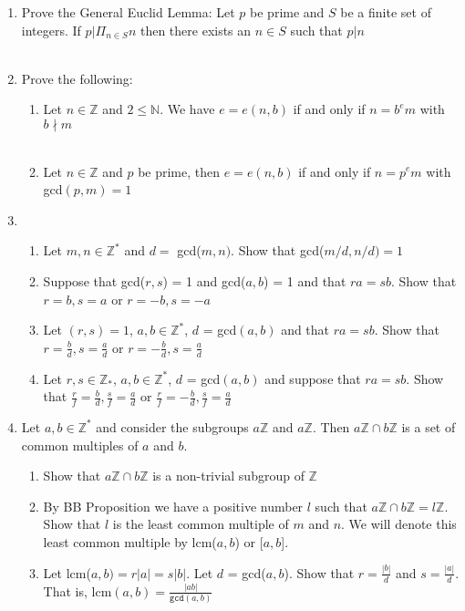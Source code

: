 \documentclass[11pt]{article}
\begin{document}
\begin{enumerate}
\begin{enumerate}
\end{enumerate}

\newpage %
\item Prove the General Euclid Lemma: Let $p$ be prime and $S$ be a finite set of integers.  If $p|\Pi_{n \in S}n$ then there exists an $n \in S$ such that $p | n$
\\
\\


\newpage %
\item Prove the following:
\begin{enumerate}
\item Let $n \in \mathbb{Z}$ and $2 \leq \mathbb{N}$.  We have $e = e(n,b)$ if and only if $n = b^em$ with $b \nmid m$\\
\\
\item Let $n \in \mathbb{Z}$ and $p$ be prime, then $e = e(n,b)$ if and only if $n = p^em$ with gcd$(p,m) = 1$
\end{enumerate}


\newpage %
\item 
\begin{enumerate}
\item Let $m,n \in \mathbb{Z}^*$ and $d = $ gcd($m,n)$.  Show that gcd($m/d , n/d) = 1$
\\
\item Suppose that gcd($r,s$) = 1 and gcd($a,b$) = 1 and that $ra = sb$.  Show that $r=b, s = a$ or $r = -b, s = -a$
\\
\item Let $(r,s) = 1$, $a,b \in \mathbb{Z}^*$, $d$ = gcd$(a,b)$ and that $ra = sb$.  Show that $r = \tfrac{b}{d}, s = \tfrac{a}{d}$ or $r = -\tfrac{b}{d}, s=\tfrac{a}{d}$
\\
\item Let $r,s \in \mathbb{Z}_*$, $a,b \in \mathbb{Z}^*$, $d$ = gcd$(a,b)$ and suppose that $ra = sb$.  Show that $\tfrac{r}{f} = \tfrac{b}{d}, \tfrac{s}{f} = \tfrac{a}{d}$ or $\tfrac{r}{f} = -\tfrac{b}{d}, \tfrac{s}{f}=\tfrac{a}{d}$
\end{enumerate}


\newpage %
\item Let $a, b \in \mathbb{Z}^*$ and consider the subgroups $a\mathbb{Z}$ and $a\mathbb{Z}$.  Then $a\mathbb{Z} \cap b\mathbb{Z}$ is a set of common multiples of $a$ and $b$.
\begin{enumerate}
\item Show that $a\mathbb{Z} \cap b\mathbb{Z}$ is a non-trivial subgroup of $\mathbb{Z}$
\\
\item By BB Proposition we have a positive number $l$ such that $a\mathbb{Z} \cap b\mathbb{Z} = l\mathbb{Z}$.  Show that $l$ is the least common multiple of $m$ and $n$.  We will denote this least common multiple by lcm($a,b$) or [$a,b$].
\\
\item Let lcm($a,b) = r|a| = s|b|$.  Let $d$ = gcd($a,b$).  Show that $r = \tfrac{|b|}{d}$ and $s = \tfrac{|a|}{d}$.  That is, lcm$(a,b) = \tfrac{|ab|}{\mathtt{gcd}(a,b)}$
\end{enumerate}



\end{enumerate}
\end{document}
